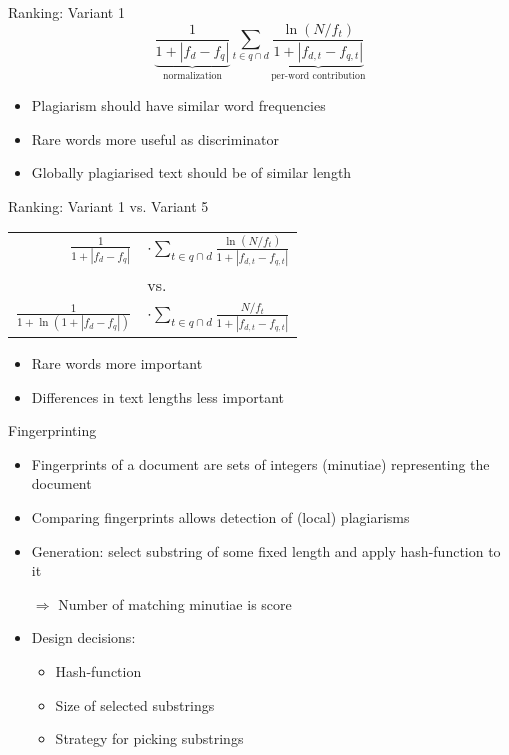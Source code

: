 \documentclass[simple]{mybeamer}
\begin{document}
\begin{frame}{Ranking: Variant 1}
  \[
    \underbrace{\frac{\text{1}}{\text{1}+|f_d-f_q|}}_{\text{normalization}} \sum_{t\in{q\cap d}} \underbrace{\frac{\ln(N/f_t)}{\text{1}+|f_{d,t}-f_{q,t}|}}_{\text{per-word contribution}}
  \]
  
  \begin{itemize}
    \item Plagiarism should have similar word frequencies
    \item Rare words more useful as discriminator
    \item Globally plagiarised text should be of similar length
  \end{itemize}
\end{frame}

\begin{frame}{Ranking: Variant 1 vs. Variant 5}
    \begin{center}\setlength{\extrarowheight}{0.5\baselineskip}
        \begin{tabular}{r@{}l}
            $\frac{\text{1}}{\text{1}+|f_d-f_q|}$ & $\cdot \sum_{t\in{q\cap d}} \frac{\ln(N/f_t)}{\text{1}+|f_{d,t}-f_{q,t}|}$ \\
            & vs. \\
            $\frac{\text{1}}{\text{1}+\ln(\text{1} + |f_d-f_q|)}$ & $\cdot \sum_{t\in{q\cap d}} \frac{N/f_t}{\text{1}+|f_{d,t}-f_{q,t}|}$\\
        \end{tabular}
    \end{center}

    \begin{itemize}
      \item Rare words more important
      \item Differences in text lengths less important
    \end{itemize}
\end{frame}

\begin{frame}{Fingerprinting}

\begin{itemize}
  \item Fingerprints of a document are sets of integers (minutiae) representing the document
  \item Comparing fingerprints allows detection of (local) plagiarisms
  \item Generation: select substring of some fixed length and apply hash-function to it
  \item[$\Rightarrow$] Number of matching minutiae is score
  
  \pause
  
  \item Design decisions:
  \begin{itemize}
    \item Hash-function
    \item Size of selected substrings
    \item Strategy for picking substrings
  \end{itemize}
\end{itemize}

\end{frame}
\end{document}
